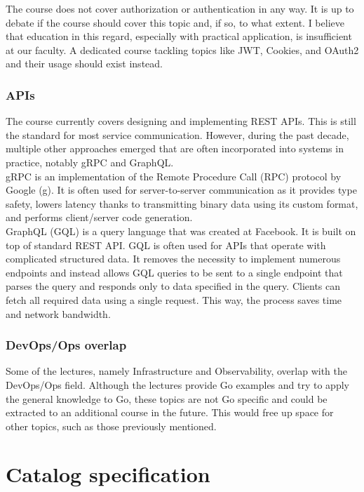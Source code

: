\documentclass[
  digital,
  color,
  oneside,
  nosansbold,
  nocolorbold,
  lof,
  lot,
]{fithesis4}
\begin{document}
The course does not cover authorization or authentication in any way. It is up to debate if the course should cover this topic and, if so, to what extent. I believe that education in this regard, especially with practical application, is insufficient at our faculty. A dedicated course tackling topics like JWT, Cookies, and OAuth2 and their usage should exist instead.

\subsubsection{APIs}

The course currently covers designing and implementing REST APIs. This is still the standard for most service communication. However, during the past decade, multiple other approaches emerged that are often incorporated into systems in practice, notably gRPC and GraphQL. \\

gRPC is an implementation of the Remote Procedure Call (RPC) protocol by Google (g). It is often used for server-to-server communication as it provides type safety, lowers latency thanks to transmitting binary data using its custom format, and performs client/server code generation. \\

GraphQL (GQL) is a query language that was created at Facebook. It is built on top of standard REST API. GQL is often used for APIs that operate with complicated structured data. It removes the necessity to implement numerous endpoints and instead allows GQL queries to be sent to a single endpoint that parses the query and responds only to data specified in the query. Clients can fetch all required data using a single request. This way, the process saves time and network bandwidth.

\subsubsection{DevOps/Ops overlap}

Some of the lectures, namely Infrastructure and Observability, overlap with the DevOps/Ops field. Although the lectures provide Go examples and try to apply the general knowledge to Go, these topics are not Go specific and could be extracted to an additional course in the future. This would free up space for other topics, such as those previously mentioned.

\section{Catalog specification}
\end{document}
